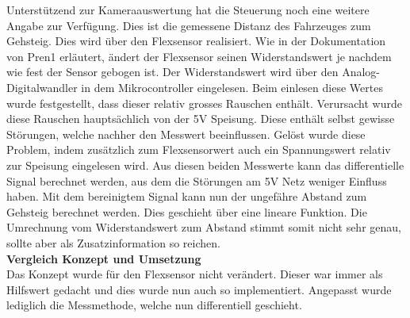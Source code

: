 Unterstützend zur Kameraauswertung hat die Steuerung noch eine weitere Angabe zur Verfügung. Dies ist die gemessene Distanz des Fahrzeuges zum Gehsteig. Dies wird über den Flexsensor realisiert. Wie in der Dokumentation von Pren1 erläutert, ändert der Flexsensor seinen Widerstandswert je nachdem wie fest der Sensor gebogen ist. Der Widerstandswert wird über den Analog-Digitalwandler in dem Mikrocontroller eingelesen. Beim einlesen diese Wertes wurde festgestellt, dass dieser relativ grosses Rauschen enthält. Verursacht wurde diese Rauschen hauptsächlich von der 5V Speisung. Diese enthält selbst gewisse Störungen, welche nachher den Messwert beeinflussen. Gelöst wurde diese Problem, indem zusätzlich zum Flexsensorwert auch ein Spannungswert relativ zur Speisung eingelesen wird. Aus diesen beiden Messwerte kann das differentielle Signal berechnet werden, aus dem die Störungen am 5V Netz weniger Einfluss haben. Mit dem bereinigtem Signal kann nun der ungefähre Abstand zum Gehsteig berechnet werden. Dies geschieht über eine lineare Funktion. Die Umrechnung vom Widerstandswert zum Abstand stimmt somit nicht sehr genau, sollte aber als Zusatzinformation so reichen.%
\\[0.2cm]
\textbf{Vergleich Konzept und Umsetzung}\\[0.2cm]
Das Konzept wurde für den Flexsensor nicht verändert. Dieser war immer als Hilfswert gedacht und dies wurde nun auch so implementiert. Angepasst wurde lediglich die Messmethode, welche nun differentiell geschieht.